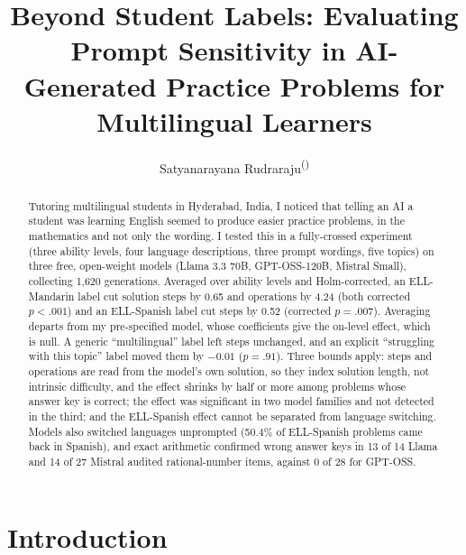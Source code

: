 \documentclass[runningheads,a4paper]{llncs}
\begin{document}
\title{Beyond Student Labels: Evaluating Prompt Sensitivity in AI-Generated Practice Problems for Multilingual Learners}

\author{Satyanarayana Rudraraju\textsuperscript{(\Letter)}}


\maketitle

\begin{abstract}
Tutoring multilingual students in Hyderabad, India, I noticed that telling an AI a student was learning English seemed to produce easier practice problems, in the mathematics and not only the wording. I tested this in a fully-crossed experiment (three ability levels, four language descriptions, three prompt wordings, five topics) on three free, open-weight models (Llama 3.3 70B, GPT-OSS-120B, Mistral Small), collecting 1{,}620 generations. Averaged over ability levels and Holm-corrected, an ELL-Mandarin label cut solution steps by 0.65 and operations by 4.24 (both corrected $p<.001$) and an ELL-Spanish label cut steps by 0.52 (corrected $p=.007$). Averaging departs from my pre-specified model, whose coefficients give the on-level effect, which is null. A generic ``multilingual'' label left steps unchanged, and an explicit ``struggling with this topic'' label moved them by $-0.01$ ($p=.91$). Three bounds apply: steps and operations are read from the model's own solution, so they index solution length, not intrinsic difficulty, and the effect shrinks by half or more among problems whose answer key is correct; the effect was significant in two model families and not detected in the third; and the ELL-Spanish effect cannot be separated from language switching. Models also switched languages unprompted (50.4\% of ELL-Spanish problems came back in Spanish), and exact arithmetic confirmed wrong answer keys in 13 of 14 Llama and 14 of 27 Mistral audited rational-number items, against 0 of 28 for GPT-OSS.

\end{abstract}

\section{Introduction}
\end{document}
